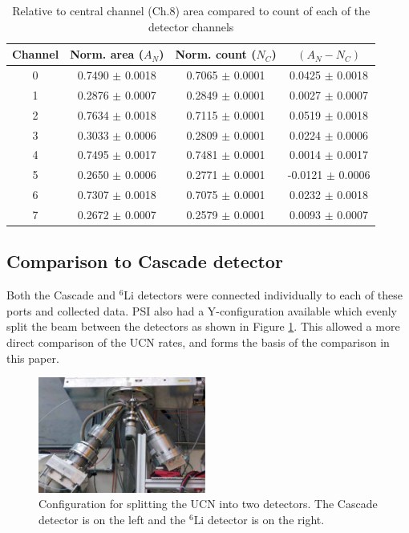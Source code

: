\documentclass[letter,twocolumn,preprint,3p]{elsarticle}
\begin{document}
\begin{table}[ht]
  \caption{Relative to central channel (Ch.8) area compared to count of each of the detector channels}
  \centering
  \begin{tabular}{c | c c | c}
    \hline \hline
 Channel  & Norm. area ($A_N$)  & Norm. count ($N_C$)  &     $( A_N - N_C )$ \\    
    \hline 
    0  &      0.7490 $\pm$   0.0018   &    0.7065 $\pm$   0.0001    &        0.0425 $\pm$   0.0018\\
    1  &      0.2876 $\pm$   0.0007   &    0.2849 $\pm$   0.0001    &        0.0027 $\pm$   0.0007\\
    2  &      0.7634 $\pm$   0.0018   &    0.7115 $\pm$   0.0001    &        0.0519 $\pm$   0.0018\\
    3  &      0.3033 $\pm$   0.0006   &    0.2809 $\pm$   0.0001    &        0.0224 $\pm$   0.0006\\
    4  &      0.7495 $\pm$   0.0017   &    0.7481 $\pm$   0.0001    &        0.0014 $\pm$   0.0017\\
    5  &      0.2650 $\pm$   0.0006   &    0.2771 $\pm$   0.0001    &       -0.0121 $\pm$   0.0006\\
    6  &      0.7307 $\pm$   0.0018   &    0.7075 $\pm$   0.0001    &        0.0232 $\pm$   0.0018\\
    7  &      0.2672 $\pm$   0.0007   &    0.2579 $\pm$   0.0001    &        0.0093 $\pm$   0.0007\\
    \hline
  \end{tabular}
\label{tab:relrates}
\end{table}





\subsection{ Comparison to Cascade detector }

Both the Cascade and $^6$Li detectors were connected individually to
each of these ports and collected data.  PSI also had a
Y-configuration available which evenly split the beam between the
detectors as shown in Figure \ref{fig:yConfig}.  This allowed a more
direct comparison of the UCN rates, and forms the basis of the
comparison in this paper.

\begin{figure}[!htpb] 
\centering \includegraphics[width=0.49\textwidth]{figures/yConfig.pdf}
\caption{Configuration for splitting the UCN into two detectors.  The
  Cascade detector is on the left and the $^6$Li detector is on the
  right.}
\label{fig:yConfig}
\end{figure}
\end{document}
